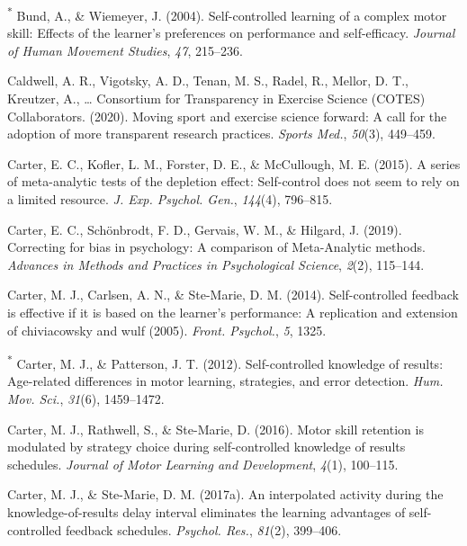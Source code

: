 \documentclass[
  english,
  man, donotrepeattitle,floatsintext]{apa7}
\newlength{\cslhangindent}
\newlength{\cslentryspacingunit} %
\newenvironment{CSLReferences}[2] %
 {%
  \setlength{\parindent}{0pt}
  \ifodd #1
  \let\oldpar\par
  \def\par{\hangindent=\cslhangindent\oldpar}
  \fi
  \setlength{\parskip}{#2\cslentryspacingunit}
 }%
 {}
\begin{document}
\begin{CSLReferences}{1}{0}
\leavevmode{}%
\textsuperscript{*} Bund, A., \& Wiemeyer, J. (2004). Self-controlled learning of a complex motor skill: Effects of the learner's preferences on performance and self-efficacy. \emph{Journal of Human Movement Studies}, \emph{47}, 215--236.

\leavevmode{}%
Caldwell, A. R., Vigotsky, A. D., Tenan, M. S., Radel, R., Mellor, D. T., Kreutzer, A., \ldots{} Consortium for Transparency in Exercise Science (COTES) Collaborators. (2020). Moving sport and exercise science forward: A call for the adoption of more transparent research practices. \emph{Sports Med.}, \emph{50}(3), 449--459.

\leavevmode{}%
Carter, E. C., Kofler, L. M., Forster, D. E., \& McCullough, M. E. (2015). A series of meta-analytic tests of the depletion effect: Self-control does not seem to rely on a limited resource. \emph{J. Exp. Psychol. Gen.}, \emph{144}(4), 796--815.

\leavevmode{}%
Carter, E. C., Schönbrodt, F. D., Gervais, W. M., \& Hilgard, J. (2019). Correcting for bias in psychology: A comparison of {Meta-Analytic} methods. \emph{Advances in Methods and Practices in Psychological Science}, \emph{2}(2), 115--144.

\leavevmode{}%
Carter, M. J., Carlsen, A. N., \& Ste-Marie, D. M. (2014). Self-controlled feedback is effective if it is based on the learner's performance: A replication and extension of chiviacowsky and wulf (2005). \emph{Front. Psychol.}, \emph{5}, 1325.

\leavevmode{}%
\textsuperscript{*} Carter, M. J., \& Patterson, J. T. (2012). Self-controlled knowledge of results: Age-related differences in motor learning, strategies, and error detection. \emph{Hum. Mov. Sci.}, \emph{31}(6), 1459--1472.

\leavevmode{}%
Carter, M. J., Rathwell, S., \& Ste-Marie, D. (2016). Motor skill retention is modulated by strategy choice during self-controlled knowledge of results schedules. \emph{Journal of Motor Learning and Development}, \emph{4}(1), 100--115.

\leavevmode{}%
Carter, M. J., \& Ste-Marie, D. M. (2017a). An interpolated activity during the knowledge-of-results delay interval eliminates the learning advantages of self-controlled feedback schedules. \emph{Psychol. Res.}, \emph{81}(2), 399--406.


\end{CSLReferences}
\end{document}
